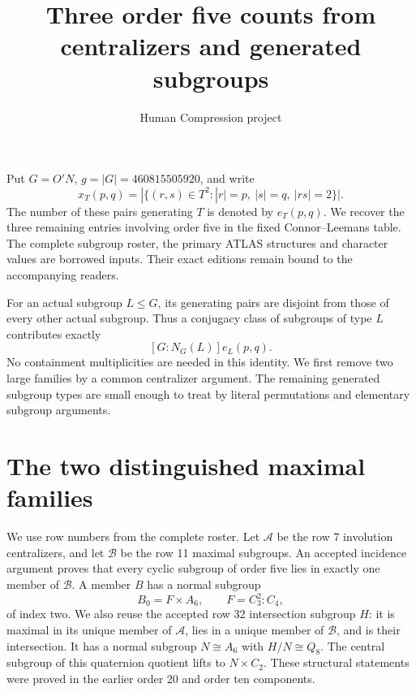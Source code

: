 \documentclass[11pt,a4paper]{article}
\title{Three order five counts from centralizers and generated subgroups}
\author{Human Compression project}\date{}
\begin{document}
\maketitle
Put $G=O'N$, $g=|G|=460815505920$, and write
\[
 x_T(p,q)=|\{(r,s)\in T^2:|r|=p,\ |s|=q,\ |rs|=2\}|.
\]
The number of these pairs generating $T$ is denoted by $e_T(p,q)$.
We recover the three remaining entries involving order five in the
fixed Connor--Leemans table. The complete subgroup roster, the
primary ATLAS structures and character values are borrowed inputs.
Their exact editions remain bound to the accompanying readers.

For an actual subgroup $L\leq G$, its generating pairs are disjoint
from those of every other actual subgroup. Thus a conjugacy class
of subgroups of type $L$ contributes exactly
\[
                       [G:N_G(L)]e_L(p,q).
\tag{1}
\]
No containment multiplicities are needed in this identity. We first
remove two large families by a common centralizer argument. The
remaining generated subgroup types are small enough to treat by
literal permutations and elementary subgroup arguments.

\section*{The two distinguished maximal families}
We use row numbers from the complete roster. Let $\mathcal A$ be the
row 7 involution centralizers, and let $\mathcal B$ be the row 11
maximal subgroups. An accepted incidence argument proves that every
cyclic subgroup of order five lies in exactly one member of
$\mathcal B$. A member $B$ has a normal subgroup
\[
 B_0=F\times A_6,\qquad F=C_3^2:C_4,
\]
of index two. We also reuse the accepted row 32 intersection
subgroup $H$: it is maximal in its unique member of $\mathcal A$,
lies in a unique member of $\mathcal B$, and is their intersection.
It has a normal subgroup $N\cong A_6$ with $H/N\cong Q_8$.
The central subgroup of this quaternion quotient lifts to
$N\times C_2$. These structural statements were proved in the
earlier order 20 and order ten components.
\end{document}
